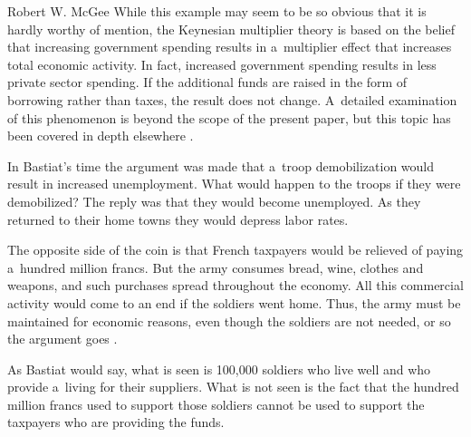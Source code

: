 \begin{artengenv}{Robert W. McGee}
While this example may seem to be so obvious that it is hardly worthy of mention, the Keynesian multiplier theory 
\parencite[][]{keynes_general_1936} %
 is based on the belief that increasing government spending results in a~multiplier effect that increases total economic activity. In fact, increased government spending results in less private sector spending. If the additional funds are raised in the form of borrowing rather than taxes, the result does not change. A~detailed examination of this phenomenon is beyond the scope of the present paper, but this topic has been covered in depth elsewhere 
\parencites[][]{ahiakpor_hawtrey_2000}[][]{dimand_hawtrey_1997}[][]{dimand_hawtrey_2000}[][]{hazlitt_economics_1946}[][]{hazlitt_failure_1959}[][]{hazlitt_critics_1960}[][]{hazlitt_economics_1979}[][]{hegeland_multiplier_1954}[][]{hutt_keynesianism--retrospect_1963}[][]{hutt_keynesian_1979}[][]{skousen_dissent_1992}[][]{terborgh_new_1968}.%




In Bastiat's time the argument was made that a~troop demobilization would result in increased unemployment. What would happen to the troops if they were demobilized? The reply was that they would become unemployed. As they returned to their home towns they would depress labor rates.



The opposite side of the coin is that French taxpayers would be relieved of paying a~hundred million francs. But the army consumes bread, wine, clothes and weapons, and such purchases spread throughout the economy. All this commercial activity would come to an end if the soldiers went home. Thus, the army must be maintained for economic reasons, even though the soldiers are not needed, or so the argument goes 
\parencite[][pp.4–5]{bastiat_selected_1964}.%




As Bastiat would say, what is seen is 100,000 soldiers who live well and who provide a~living for their suppliers. What is not seen is the fact that the hundred million francs used to support those soldiers cannot be used to support the taxpayers who are providing the funds.




\end{artengenv}

